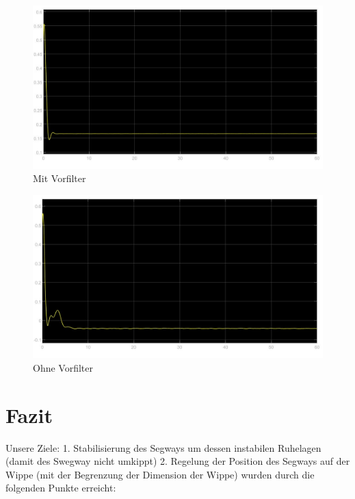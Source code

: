 \documentclass[pdf]{ifacconf}
\begin{document}
\begin{figure}[h]	
\centerline{\includegraphics[width=\linewidth]{Bilder/Plots/MitVorfilter.jpg}}
	\label{MitVorfilter}
	\caption{Mit Vorfilter}
\end{figure}

\begin{figure}[h]	
\centerline{\includegraphics[width=\linewidth]{Bilder/Plots/OhneVorfilter.jpg}}
	\label{OhneVorfilter}
	\caption{Ohne Vorfilter}
\end{figure}




\section{Fazit}

Unsere Ziele: 1. Stabilisierung des Segways um dessen instabilen Ruhelagen (damit des Swegway nicht umkippt) 2. Regelung der Position des Segways auf der Wippe (mit der Begrenzung der Dimension der Wippe) wurden durch die folgenden Punkte erreicht:
\end{document}
